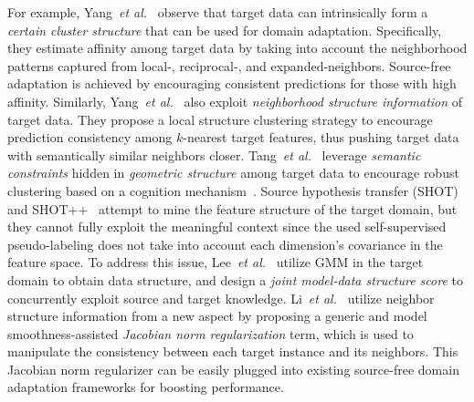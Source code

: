 \documentclass[10pt,journal,compsoc]{IEEEtran}
\def\etal{{\em et al.}}
\begin{document}
For example, Yang~\etal~\cite{yang2021exploiting} observe that target data can intrinsically form a \emph{certain cluster structure} that can be used for %
domain adaptation.
Specifically, they estimate affinity among target data by taking into account the neighborhood patterns captured from local-, reciprocal-, and expanded-neighbors.
Source-free adaptation is achieved by encouraging consistent predictions for those with high affinity.
Similarly, Yang~\etal~\cite{yang2021generalized} also exploit \emph{neighborhood structure information} of target data.
They propose a local structure clustering strategy to encourage prediction consistency among $k$-nearest target features, thus pushing target data with semantically similar neighbors closer.
Tang~\etal~\cite{tang2021nearest} leverage \emph{semantic constraints} hidden in \emph{geometric structure} among target data to encourage robust clustering based on a cognition mechanism~\cite{ashby2005human}.
Source hypothesis transfer (SHOT)~\cite{liang2020we} and SHOT++~\cite{liang2021source} attempt to mine the feature structure of the target domain, but they cannot fully exploit the meaningful context since the used self-supervised pseudo-labeling does not take into account each dimension's covariance in the feature space.
To address this issue, Lee~\etal~\cite{lee2022confidence} utilize GMM in the target domain to obtain data structure, and design a \emph{joint model-data structure score} to concurrently exploit source and target knowledge.
Li~\etal~\cite{li2022jacobian} utilize neighbor structure information from a new aspect by proposing a generic and model smoothness-assisted \emph{Jacobian norm regularization} term, which is used to manipulate the consistency between each target instance and its neighbors.
This Jacobian norm regularizer can be easily plugged into existing source-free domain adaptation frameworks for boosting performance. 
\end{document}
